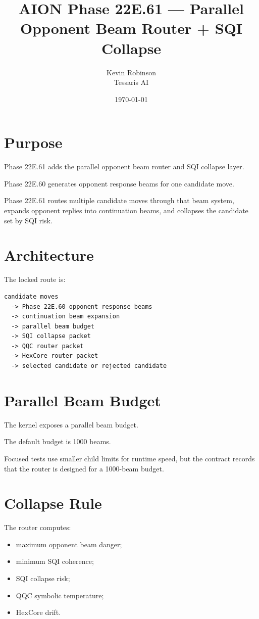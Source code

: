\documentclass[11pt,a4paper]{article}
\title{\textbf{AION Phase 22E.61 --- Parallel Opponent Beam Router + SQI Collapse}}
\author{Kevin Robinson\\Tessaris AI}
\date{\today}
\begin{document}
\maketitle

\section{Purpose}

Phase 22E.61 adds the parallel opponent beam router and SQI collapse layer.

Phase 22E.60 generates opponent response beams for one candidate move.

Phase 22E.61 routes multiple candidate moves through that beam system, expands opponent replies into continuation beams, and collapses the candidate set by SQI risk.

\section{Architecture}

The locked route is:

\begin{verbatim}
candidate moves
  -> Phase 22E.60 opponent response beams
  -> continuation beam expansion
  -> parallel beam budget
  -> SQI collapse packet
  -> QQC router packet
  -> HexCore router packet
  -> selected candidate or rejected candidate
\end{verbatim}

\section{Parallel Beam Budget}

The kernel exposes a parallel beam budget.

The default budget is 1000 beams.

Focused tests use smaller child limits for runtime speed, but the contract records that the router is designed for a 1000-beam budget.

\section{Collapse Rule}

The router computes:

\begin{itemize}
  \item maximum opponent beam danger;
  \item minimum SQI coherence;
  \item SQI collapse risk;
  \item QQC symbolic temperature;
  \item HexCore drift.
\end{itemize}
\end{document}
